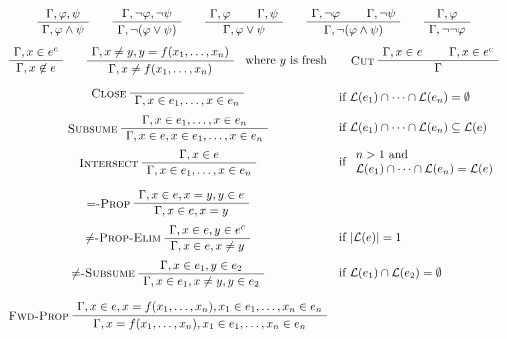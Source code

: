 \begin{table}
  \begin{gather*}
    \infer
    {\seqq{\varphi \wedge \psi}}
    {\seqq{\varphi, \psi}}
    \qquad
    \infer
    {\seqq{ \neg(\varphi \vee \psi)}}
    {\seqq{ \neg\varphi, \neg\psi}}
    \qquad
    \inferii
    {\seqq{\varphi \vee \psi}}
    {\seqq{\varphi}}{\seqq{\psi}}
    \qquad
    \inferii
    {\seqq{\neg(\varphi \wedge \psi)}}
    {\seqq{\neg\varphi}}{\seqq{\neg\psi}}
    \qquad
    \infer
    {\seqq{ \neg\neg\varphi}}
    {\seqq{\varphi}}
    \\[1ex]
    \infer
    {\seqq{x \not\in e}}
    {\seqq{x \in e^c}}
    \qquad
    \inferC{\text{where~} y \text{~is fresh}}
    {\seqq{x \not= f(x_1, \ldots, x_n)}}
    {\seqq{x \not= y, y = f(x_1, \ldots, x_n)}}
    \qquad
    \inferii[Cut]
    {\seqq{}}
    {\seqq{x \in e}}{\seqq{x \in e^c}}
    \\[2ex]
    \begin{array}{cl}
      \infer[Close]
      {\seqq{x \in e_1, \ldots, x \in e_n}}
      {}
      &
        \text{if~} \lang{e_1} \cap \cdots \cap\lang{e_n} = \emptyset
      \\[2ex]
      \infer[Subsume]
      {\seqq{x \in e, x \in e_1, \ldots, x \in e_n}}
      {\seqq{x \in e_1, \ldots, x \in e_n}}
      &
        \text{if~} \lang{e_1} \cap \cdots \cap\lang{e_n} \subseteq \lang{e}
      \\[2.5ex]
      \infer[Intersect]
      {\seqq{x \in e_1, \ldots, x \in e_n}}
      {\seqq{x \in e}}
      &
        \text{if~}
        \begin{array}{l}
          n > 1 \text{~and~}
          \\
          \lang{e_1} \cap \cdots \cap\lang{e_n} = \lang{e}
        \end{array}
      \\[4ex]
      \infer[$=$-Prop]
      {\seqq{x \in e, x = y}}
      {\seqq{x \in e, x = y, y \in e}}
      \\[3ex]
      \infer[$\not=$-Prop-Elim]
      {\seqq{x \in e, x \not= y}}
      {\seqq{x \in e, y \in e^c}}
      &
        \text{if~} |\lang{e}| = 1
      \\[3ex]
      \infer[$\not=$-Subsume]
      {\seqq{x \in e_1, x \not= y, y \in e_2}}
      {\seqq{x \in e_1, y \in e_2}}
      &
        \text{if~} \lang{e_1} \cap \lang{e_2} = \emptyset
      \\[4ex]
      \infer[Fwd-Prop]
      {\seqq{x = f(x_1, \ldots, x_n), x_1 \in e_1, \ldots, x_n \in e_n}}
      {\seqq{x \in e, x = f(x_1, \ldots, x_n), x_1 \in e_1, \ldots, x_n \in e_n}}

\end{array}
\end{gather*}
\end{table}
